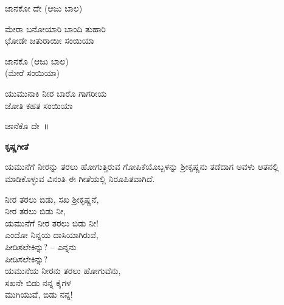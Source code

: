 \begin{flushright}
ಜಾನಕೋ ದೇ (ಆಜು ಬಾಲ)
\end{flushright}

\begin{myquote}
ಮೇರಾ ಬನೋಯಾರಿ ಬಾಂದಿ ತುಹಾರಿ\\ಛೋಡೇ ಜತುರಾಯೀ ಸಂಯಿಯಾ
\end{myquote}

\begin{flushright}
ಜಾನಕೊ (ಆಜು ಬಾಲ)\\(ಮೇರೆ ಸಂಯಿಯಾ)
\end{flushright}

\begin{myquote}
ಯುಮುನಾಕಿ ನೀರ ಬಾರೊ ಗಾಗರೀಯ\\ಜೋತಿ ಕಹತ ಸಂಯಿಯಾ
\end{myquote}

\begin{flushright}
ಜಾನೆಕೊ ದೇ~॥
\end{flushright}

\begin{center}
\textbf{ಕೃಷ್ಣಗೀತೆ}
\end{center}

ಯಮುನೆಗೆ ನೀರನ್ನು ತರಲು ಹೋಗುತ್ತಿರುವ ಗೋಪಿಕೆಯೊಬ್ಬಳನ್ನು ಶ‍್ರೀಕೃಷ್ಣನು ತಡೆದಾಗ ಅವಳು ಆತನಲ್ಲಿ ಮಾಡಿಕೊಳ್ಳುವ ವಿನಂತಿ ಈ ಗೀತೆಯಲ್ಲಿ ನಿರೂಪಿತವಾಗಿದೆ.

\begin{myquote}
ನೀರ ತರಲು ಬಿಡು, ಸಖ ಶ‍್ರೀಕೃಷ್ಣನೆ,\\ನೀರ ತರಲು ಬಿಡು ನೀ,\\ಯಮುನೆಗೆ ನೀರ ತರಲು ಬಿಡು ನೀ!\\ಎಂದೋ ನಿನ್ನಯ ದಾಸಿಯಾಗಿರುವೆ,\\ಪೀಡಿಸಲೇಕಿನ್ನು? – ಎನ್ನನು\\ಪೀಡಿಸಲೇಕಿನ್ನು?\\ಯಮುನೆಯ ನೀರನು ತರಲು ಹೋಗುವೆನು,\\ಸಖನೇ ಬಿಡು ನನ್ನ ಕೈಗಳ\\ಮುಗಿಯುವೆ, ಬಿಡು ನನ್ನ!
\end{myquote}

